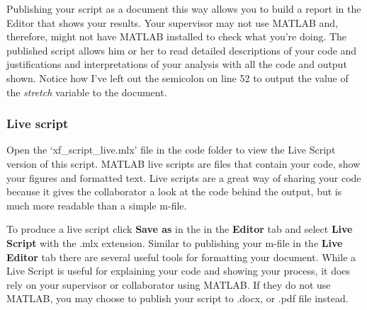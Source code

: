 \documentclass[12pt,a4paper]{article}
\begin{document}
Publishing your script as a document this way allows you to build a report in the Editor that shows your results.
Your supervisor may not use MATLAB and, therefore, might not have MATLAB installed to check what you're doing. 
The published script allows him or her to read detailed descriptions of your code and justifications and interpretations of your analysis with all the code and output shown.
Notice how I've left out the semicolon on line 52 to output the value of the \emph{stretch} variable to the document.

\subsubsection{Live script}
Open the `xf\_script\_live.mlx' file in the code folder to view the Live Script version of this script.
MATLAB live scripts are files that contain your code, show your figures and formatted text.
Live scripts are a great way of sharing your code because it gives the collaborator a look at the code behind the output, but is much more readable than a simple m-file.

To produce a live script click \textbf{Save as} in the in the \textbf{Editor} tab and select \textbf{Live Script} with the .mlx extension.
Similar to publishing your m-file in the \textbf{Live Editor} tab there are several useful tools for formatting your document.
While a Live Script is useful for explaining your code and showing your process, it does rely on your supervisor or collaborator using MATLAB.
If they do not use MATLAB, you may choose to publish your script to .docx, or .pdf file instead.
\end{document}
